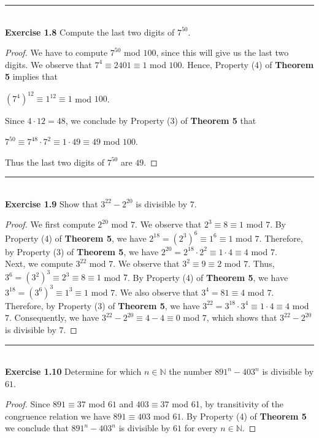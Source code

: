 \documentclass[a4paper]{article}
\begin{document}
\noindent\rule{12cm}{0.4pt}\\
\noindent \textbf{Exercise 1.8} Compute the last two digits of $7^{50}$.
\begin{proof}
We have to compute $7^{50}$ mod $100$, since this will give us the last two digits. We observe that $7^{4} \equiv 2401 \equiv 1$ mod $100$. Hence, Property (4) of \textbf{Theorem 5} implies that
\begin{center}
$(7^{4})^{12} \equiv 1^{12} \equiv 1$ mod $100$.
\end{center}
Since $4 \cdot 12 = 48$, we conclude by Property (3) of \textbf{Theorem 5} that
\begin{center}
$7^{50} \equiv 7^{48} \cdot 7^{2} \equiv 1 \cdot 49 \equiv 49$ mod $100$.
\end{center}
Thus the last two digits of $7^{50}$ are $49$.
\end{proof}



\noindent\rule{12cm}{0.4pt}\\
\noindent \textbf{Exercise 1.9} Show that $3^{22}-2^{20}$ is divisible by $7$.
\begin{proof}
We first compute $2^{20}$ mod $7$. We observe that $2^{3} \equiv 8 \equiv 1$ mod $7$. By Property (4) of \textbf{Theorem 5}, we have $2^{18} = (2^{3})^{6} \equiv 1^{6} \equiv 1$ mod $7$. Therefore, by Property (3) of \textbf{Theorem 5}, we have $2^{20} = 2^{18} \cdot 2^{2} \equiv 1 \cdot 4 \equiv 4$ mod $7$.\\
Next, we compute $3^{22}$ mod $7$. We observe that $3^{2} \equiv 9 \equiv 2$ mod $7$. Thus, $3^{6} = (3^{2})^{3} \equiv 2^{3} \equiv 8 \equiv 1$ mod $7$. By Property (4) of \textbf{Theorem 5}, we have $3^{18} = (3^{6})^{3} \equiv 1^{3} \equiv 1$ mod $7$. We also observe that $3^{4} = 81 \equiv 4$ mod $7$.\\
Therefore, by Property (3) of \textbf{Theorem 5}, we have $3^{22} = 3^{18} \cdot 3^{4} \equiv 1 \cdot 4 \equiv 4$ mod $7$. Consequently, we have $3^{22} - 2^{20} \equiv 4 - 4 \equiv 0$ mod $7$, which shows that $3^{22} - 2^{20}$ is divisible by $7$.
\end{proof}



\noindent\rule{12cm}{0.4pt}\\
\noindent \textbf{Exercise 1.10} Determine for which $n \in \mathbb{N}$ the number $891^n - 403^n$ is divisible by $61$.
\begin{proof}
Since $891 \equiv 37$ mod $61$ and $403 \equiv 37$ mod 61, by transitivity of the congruence relation we have $891 \equiv 403$ mod $61$. By Property (4) of \textbf{Theorem 5} we conclude that $891^{n}-403^{n}$ is divisible by $61$ for every $n \in \mathbb{N}$.
\end{proof}
\end{document}
